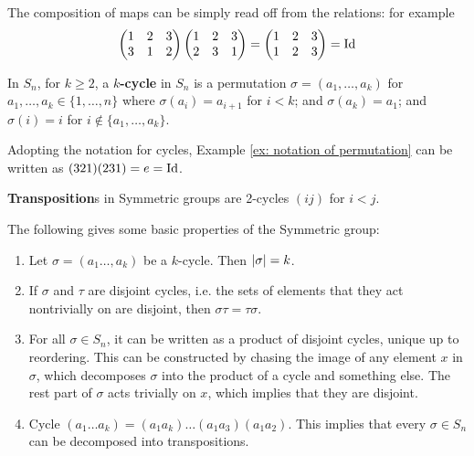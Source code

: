 \begin{example}\label{ex: notation of permutation}
    The composition of maps can be simply read off from the relations: for example
    \[
        \begin{pmatrix}
            1 & 2 & 3 \\
            3 & 1 & 2 \\
        \end{pmatrix}
        \begin{pmatrix}
            1 & 2 & 3 \\
            2 & 3 & 1 \\
        \end{pmatrix} = 
        \begin{pmatrix}
            1 & 2 & 3 \\
            1 & 2 & 3 \\
        \end{pmatrix} = \mathrm{Id}
    \]
\end{example}

\begin{definition}[Cycle]
    In $S_n$, for $k \geq 2$, a \textbf{$k$-cycle} in $S_n$ is a permutation $\sigma = (a_1, \dots, a_k)$ for $a_1, \dots, a_k \in \{1, \dots, n\}$ where $\sigma(a_i) = a_{i+1}$ for $i < k$; and $\sigma(a_k) = a_1$; and $\sigma(i) = i$ for $i \notin \{a_1, \dots, a_k\}$.
\end{definition}

\begin{example}\label{ex: notation of permutation using cycles}
    Adopting the notation for cycles, Example \ref{ex: notation of permutation} can be written as $(3 2 1)(2 3 1) = e = \mathrm{Id}$.
\end{example}

\begin{definition}[Transposition]
    \textbf{Transposition}s in Symmetric groups are 2-cycles $(i j)$ for $i < j$.
\end{definition}

\begin{remark}\label{rmk: basic properties of symmetric group}
    The following gives some basic properties of the Symmetric group:
    \begin{enumerate}
        \item Let $\sigma = (a_1 \dots, a_k)$ be a $k$-cycle. Then $\left|\sigma\right| = k$.
        \item If $\sigma$ and $\tau$ are disjoint cycles, i.e. the sets of elements that they act nontrivially on are disjoint, then $\sigma\tau = \tau\sigma$.
        \item For all $\sigma \in S_n$, it can be written as a product of disjoint cycles, unique up to reordering. This can be constructed by chasing the image of any element $x$ in $\sigma$, which decomposes $\sigma$ into the product of a cycle and something else. The rest part of $\sigma$ acts trivially on $x$, which implies that they are disjoint.
        \item Cycle $(a_1 \dots a_k) = (a_1 a_k)\dots (a_1 a_3) (a_1 a_2)$. This implies that every $\sigma \in S_n$ can be decomposed into transpositions.
    \end{enumerate}
\end{remark}

